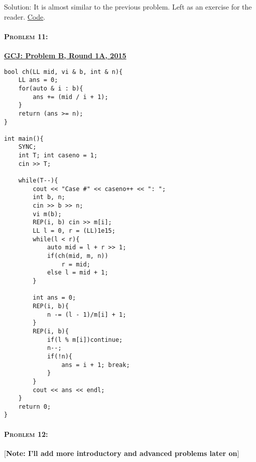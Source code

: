 \documentclass[12pt]{article}
\begin{document}
\begin{large}
Solution: It is almost similar to the previous problem. Left as an exercise for the reader. \href{http://codeforces.com/contest/371/submission/25957289}{Code}.

\paragraph{\large \textsc{Problem 11:}} \href{https://code.google.com/codejam/contest/4224486/dashboard#s=p1&a=1}{\textbf{GCJ: Problem B, Round 1A, 2015}}

\begin{verbatim}
bool ch(LL mid, vi & b, int & n){
	LL ans = 0; 
	for(auto & i : b){
		ans += (mid / i + 1); 
	}
	return (ans >= n); 
}

int main(){
	SYNC; 
	int T; int caseno = 1; 
	cin >> T; 

	while(T--){
		cout << "Case #" << caseno++ << ": "; 
		int b, n; 
		cin >> b >> n; 
		vi m(b); 
		REP(i, b) cin >> m[i]; 
		LL l = 0, r = (LL)1e15; 
		while(l < r){
			auto mid = l + r >> 1; 
			if(ch(mid, m, n))
				r = mid; 
			else l = mid + 1; 
		}

		int ans = 0;
		REP(i, b){
			n -= (l - 1)/m[i] + 1; 
		}
		REP(i, b){
			if(l % m[i])continue; 
			n--; 
			if(!n){
				ans = i + 1; break; 
			}
		}
		cout << ans << endl; 
	}
	return 0; 
}
\end{verbatim}
\begin{LARGE}

\paragraph{\large \textsc{Problem 12:}}
\href{}
[\textbf{Note: I'll add more introductory and advanced problems later on}]
\end{LARGE}

\end{large}
\end{document}

